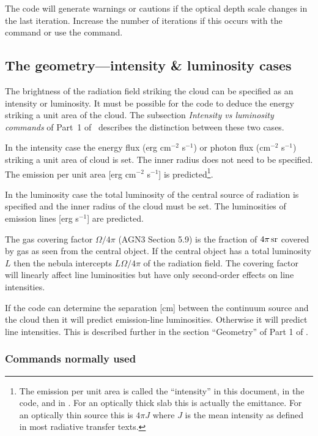 \documentclass[12pt,twoside]{article}
\begin{document}
The code will generate warnings
or cautions if the optical depth scale
changes in the last iteration.
Increase the number of iterations if this
occurs with the  command
or use the  command.

\subsection{The geometry---intensity \& luminosity cases}

The brightness of the radiation field striking the cloud can be specified as
an intensity or luminosity.
It must be possible for the code to deduce the energy
striking a unit area of the cloud.
The subsection \emph{Intensity vs luminosity commands}
of Part~1 of \Hazy\ describes the
distinction between these two cases.

In the intensity case the energy flux (erg
cm$^{-2}$ s$^{-1}$) or photon flux (cm$^{-2}$
s$^{-1}$) striking a unit area of cloud is set.
The inner radius does not need
to be specified.
The emission per unit area
[erg cm$^{-2}$ s$^{-1}$] is predicted\footnote{The emission
per unit area is called the ``intensity'' in this
document, in the code, and in \Hazy.  For an optically thick slab this is
actually the emittance.  For an optically thin source this is $4\pi J$ where
$J$ is the mean intensity as defined in most radiative transfer texts.}.

In the luminosity case the total luminosity of the central source of
radiation is specified and the inner radius of the cloud must be set.  The
luminosities of emission lines [erg s$^{-1}$] are predicted.

The gas covering factor $\Omega/4\pi$
(AGN3 Section 5.9) is the fraction of $4\pi {\rm\thinspace sr}$ covered by gas
as seen from the central object.  If the central object
has a total luminosity $L$ then the nebula
intercepts $L\Omega/4\pi$ of the radiation
field.  The covering factor will linearly affect line luminosities but have
only second-order effects on line intensities.

If the code can determine the separation [cm] between the continuum source
and the cloud then it will predict emission-line luminosities.  Otherwise
it will predict line intensities.  This is described further in the section
``Geometry'' of Part 1 of \Hazy.

\subsubsection{Commands normally used}
\end{document}
